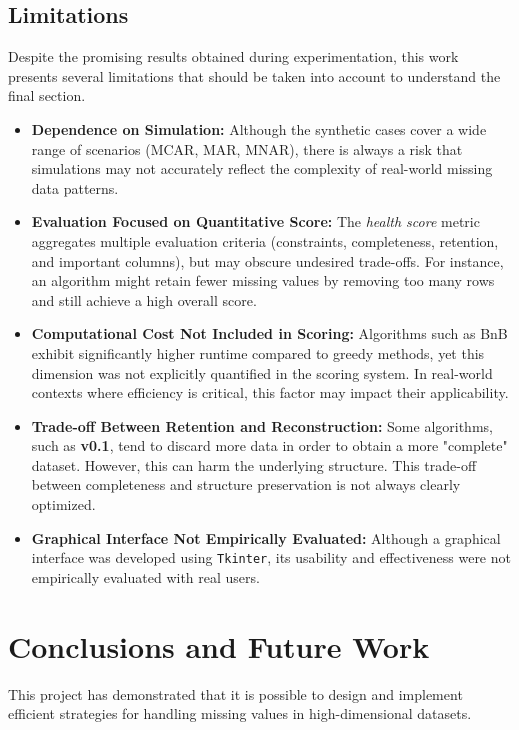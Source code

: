 \documentclass[a4paper,12pt]{article}
\begin{document}
\subsection{Limitations}
Despite the promising results obtained during experimentation, this work presents several limitations that should be taken into account to understand the final section.

\begin{itemize}
    \item \textbf{Dependence on Simulation:} Although the synthetic cases cover a wide range of scenarios (MCAR, MAR, MNAR), there is always a risk that simulations may not accurately reflect the complexity of real-world missing data patterns.

    \item \textbf{Evaluation Focused on Quantitative Score:} The \textit{health score} metric aggregates multiple evaluation criteria (constraints, completeness, retention, and important columns), but may obscure undesired trade-offs. For instance, an algorithm might retain fewer missing values by removing too many rows and still achieve a high overall score.

    \item \textbf{Computational Cost Not Included in Scoring:} Algorithms such as BnB exhibit significantly higher runtime compared to greedy methods, yet this dimension was not explicitly quantified in the scoring system. In real-world contexts where efficiency is critical, this factor may impact their applicability.

    \item \textbf{Trade-off Between Retention and Reconstruction:} Some algorithms, such as \textbf{v0.1}, tend to discard more data in order to obtain a more "complete" dataset. However, this can harm the underlying structure. This trade-off between completeness and structure preservation is not always clearly optimized.

    \item \textbf{Graphical Interface Not Empirically Evaluated:} Although a graphical interface was developed using \texttt{Tkinter}, its usability and effectiveness were not empirically evaluated with real users.
\end{itemize}
\newpage
\section{Conclusions and Future Work}
This project has demonstrated that it is possible to design and implement efficient strategies for handling missing values in high-dimensional datasets.
\end{document}
